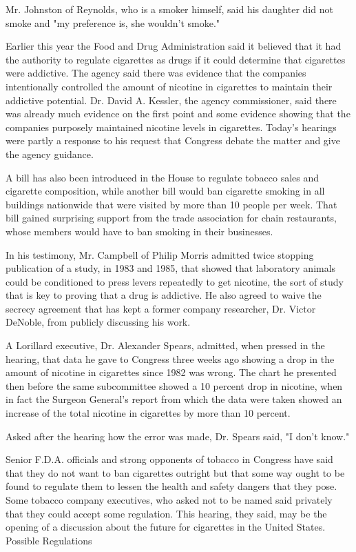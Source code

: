 Mr. Johnston of Reynolds, who is a smoker himself, said his daughter did
not smoke and "my preference is, she wouldn't smoke."

Earlier this year the Food and Drug Administration said it believed that
it had the authority to regulate cigarettes as drugs if it could
determine that cigarettes were addictive. The agency said there was
evidence that the companies intentionally controlled the amount of
nicotine in cigarettes to maintain their addictive potential. Dr. David
A. Kessler, the agency commissioner, said there was already much
evidence on the first point and some evidence showing that the companies
purposely maintained nicotine levels in cigarettes. Today's hearings
were partly a response to his request that Congress debate the matter
and give the agency guidance.

A bill has also been introduced in the House to regulate tobacco sales
and cigarette composition, while another bill would ban cigarette
smoking in all buildings nationwide that were visited by more than 10
people per week. That bill gained surprising support from the trade
association for chain restaurants, whose members would have to ban
smoking in their businesses.

In his testimony, Mr. Campbell of Philip Morris admitted twice stopping
publication of a study, in 1983 and 1985, that showed that laboratory
animals could be conditioned to press levers repeatedly to get nicotine,
the sort of study that is key to proving that a drug is addictive. He
also agreed to waive the secrecy agreement that has kept a former
company researcher, Dr. Victor DeNoble, from publicly discussing his
work.

A Lorillard executive, Dr. Alexander Spears, admitted, when pressed in
the hearing, that data he gave to Congress three weeks ago showing a
drop in the amount of nicotine in cigarettes since 1982 was wrong. The
chart he presented then before the same subcommittee showed a 10 percent
drop in nicotine, when in fact the Surgeon General's report from which
the data were taken showed an increase of the total nicotine in
cigarettes by more than 10 percent.

Asked after the hearing how the error was made, Dr. Spears said, "I
don't know."

Senior F.D.A. officials and strong opponents of tobacco in Congress have
said that they do not want to ban cigarettes outright but that some way
ought to be found to regulate them to lessen the health and safety
dangers that they pose. Some tobacco company executives, who asked not
to be named said privately that they could accept some regulation. This
hearing, they said, may be the opening of a discussion about the future
for cigarettes in the United States. Possible Regulations

